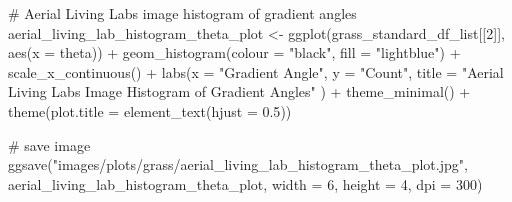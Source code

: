 \documentclass[
  letterpaper,
  DIV=11,
  numbers=noendperiod]{scrreprt}
\newenvironment{Shaded}{\begin{snugshade}}{\end{snugshade}}
\newcommand{\AttributeTok}[1]{\textcolor[rgb]{0.40,0.45,0.13}{#1}}
\newcommand{\CommentTok}[1]{\textcolor[rgb]{0.37,0.37,0.37}{#1}}
\newcommand{\DecValTok}[1]{\textcolor[rgb]{0.68,0.00,0.00}{#1}}
\newcommand{\FloatTok}[1]{\textcolor[rgb]{0.68,0.00,0.00}{#1}}
\newcommand{\FunctionTok}[1]{\textcolor[rgb]{0.28,0.35,0.67}{#1}}
\newcommand{\NormalTok}[1]{\textcolor[rgb]{0.00,0.23,0.31}{#1}}
\newcommand{\OtherTok}[1]{\textcolor[rgb]{0.00,0.23,0.31}{#1}}
\newcommand{\SpecialCharTok}[1]{\textcolor[rgb]{0.37,0.37,0.37}{#1}}
\newcommand{\StringTok}[1]{\textcolor[rgb]{0.13,0.47,0.30}{#1}}
\begin{document}
\begin{Shaded}
\begin{Highlighting}[]
\CommentTok{\# Aerial Living Labs image histogram of gradient angles}
\NormalTok{aerial\_living\_lab\_histogram\_theta\_plot }\OtherTok{\textless{}{-}}
  \FunctionTok{ggplot}\NormalTok{(grass\_standard\_df\_list[[}\DecValTok{2}\NormalTok{]], }
         \FunctionTok{aes}\NormalTok{(}\AttributeTok{x =}\NormalTok{ theta)) }\SpecialCharTok{+}
  \FunctionTok{geom\_histogram}\NormalTok{(}\AttributeTok{colour =} \StringTok{"black"}\NormalTok{, }\AttributeTok{fill =} \StringTok{"lightblue"}\NormalTok{) }\SpecialCharTok{+}
  \FunctionTok{scale\_x\_continuous}\NormalTok{() }\SpecialCharTok{+} 
  \FunctionTok{labs}\NormalTok{(}\AttributeTok{x =} \StringTok{"Gradient Angle"}\NormalTok{, }
       \AttributeTok{y =} \StringTok{"Count"}\NormalTok{, }
       \AttributeTok{title =} \StringTok{"Aerial Living Labs Image Histogram of Gradient Angles"}
\NormalTok{  ) }\SpecialCharTok{+}
  \FunctionTok{theme\_minimal}\NormalTok{() }\SpecialCharTok{+}
  \FunctionTok{theme}\NormalTok{(}\AttributeTok{plot.title =} \FunctionTok{element\_text}\NormalTok{(}\AttributeTok{hjust =} \FloatTok{0.5}\NormalTok{))}

\CommentTok{\# save image}
\FunctionTok{ggsave}\NormalTok{(}\StringTok{"images/plots/grass/aerial\_living\_lab\_histogram\_theta\_plot.jpg"}\NormalTok{, }
\NormalTok{       aerial\_living\_lab\_histogram\_theta\_plot, }\AttributeTok{width =} \DecValTok{6}\NormalTok{, }\AttributeTok{height =} \DecValTok{4}\NormalTok{, }\AttributeTok{dpi =} \DecValTok{300}\NormalTok{)}
\end{Highlighting}
\end{Shaded}
\end{document}
